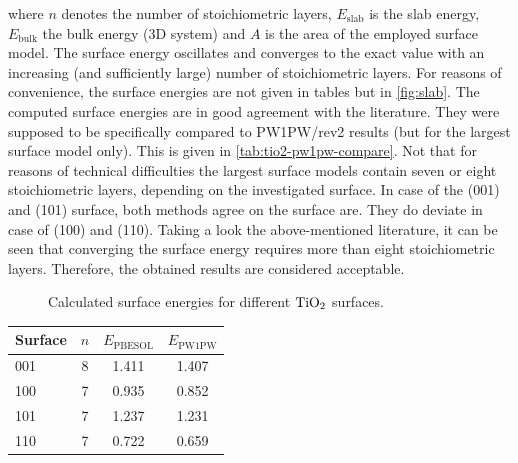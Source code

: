 \documentclass[a4paper,12pt]{scrartcl}
\begin{document}
where $ n $ denotes the number of stoichiometric layers, $ E_\mathrm{slab} $ is the slab energy, $ E_\mathrm{bulk} $ the bulk energy (3D system) and $ A $ is the area of the employed surface model. The surface energy oscillates and converges to the exact value with an increasing (and sufficiently large) number of stoichiometric layers. For reasons of convenience, the surface energies are not given in tables but in \autoref{fig:slab}. The computed surface energies are in good agreement with the literature.\autocite{rutile-surface-energy} They were supposed to be specifically compared to PW1PW/rev2 results (but for the largest surface model only). This is given in \autoref{tab:tio2-pw1pw-compare}. Not that for reasons of technical difficulties the largest surface models contain seven or eight stoichiometric layers, depending on the investigated surface. In case of the (001) and (101) surface, both methods agree on the surface are. They do deviate in case of (100) and (110). Taking a look the above-mentioned literature, it can be seen that converging the surface energy requires more than eight stoichiometric layers. Therefore, the obtained results are considered acceptable. 
%
\begin{figure}[H]
	\centering
	
	\vspace{-20pt}
	\caption{Calculated surface energies for different $ \ce{TiO2} $ surfaces.}
	\label{fig:slab}
\end{figure}
%
\begin{table}[H]
	\centering
	\label{tab:tio2-pw1pw-compare}
	\begin{tabular}{lccc}
		\toprule
		Surface & $n$ & $ E_\mathrm{PBESOL}$ & $ E_\mathrm{PW1PW} $ \\
		\midrule
		001     & 8 & 1.411     & 1.407    \\
		100     & 7 & 0.935     & 0.852    \\
		101     & 7 & 1.237     & 1.231    \\
		110     & 7 & 0.722     & 0.659    \\
		\bottomrule
	\end{tabular}
\end{table}
%
\end{document}
